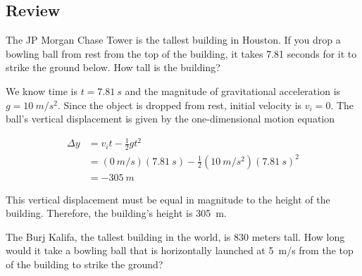 \documentclass[answers]{exam}
\begin{document}
\clearpage

\subsection*{Review}

\begin{questions}

\question
The JP Morgan Chase Tower is the tallest building in Houston. If you drop a bowling ball from rest from the top of the building, it takes 7.81 seconds for it to strike the ground below. How tall is the building?

\begin{solutionorbox}[4cm]
We know time is $t = \SI{7.81}{s}$ and the magnitude of gravitational acceleration is $g = \SI{10}{m/s^2}$. Since the object is dropped from rest, initial velocity is $v_i = 0$. The ball's vertical displacement is given by the one-dimensional motion equation

\vspace{-1em}
\begin{align*}
    \Delta y &= v_i t - \frac{1}{2}g t^2 \\[1ex]
    &= (\SI{0}{m/s})(\SI{7.81}{s}) - \frac{1}{2} (\SI{10}{m/s^2})(\SI{7.81}{s})^2 \\[1ex]
    &= -\SI{305}{m}
\end{align*}

This vertical displacement must be equal in magnitude to the height of the building. Therefore, the building's height is \SI{305}{m}.    
\end{solutionorbox}

\question
The Burj Kalifa, the tallest building in the world, is 830 meters tall. How long would it take a bowling ball that is horizontally launched at \SI{5}{m/s} from the top of the building to strike the ground?

\medskip

\begin{minipage}{0.25\textwidth}
\end{minipage}
\hspace{2mm}%
\end{questions}
\end{document}
